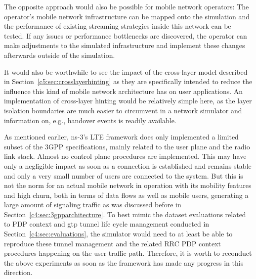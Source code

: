 The opposite approach would also be possible for mobile network operators: The operator's mobile network infrastructure can be mapped onto the simulation and the performance of existing streaming strategies inside this network can be tested. If any issues or performance bottlenecks are discovered, the operator can make adjustments to the simulated infrastructure and implement these changes afterwards outside of the simulation.

It would also be worthwhile to see the impact of the cross-layer model described in Section~\ref{c5:sec:crosslayerhinting} as they are specifically intended to reduce the influence this kind of mobile network architecture has on user applications. An implementation of cross-layer hinting would be relatively simple here, as the layer isolation boundaries are much easier to circumvent in a network simulator and information on, e.g., handover events is readily available.

As mentioned earlier, ns-3's \gls{LTE} framework does only implemented a limited subset of the \gls{3GPP} specifications, mainly related to the user plane and the radio link stack. Almost no control plane procedures are implemented. This may have only a negligible impact as soon as a connection is established and remains stable and only a very small number of users are connected to the system. But this is not the norm for an actual mobile network in operation with its mobility features and high churn, both in terms of data flows as well as mobile users, generating a large amount of signaling traffic as was discussed before in Section~\ref{c4:sec:3gpparchitecture}. To best mimic the dataset evaluations related to \gls{PDP} context and \gls{gtp} tunnel life cycle management conducted in Section~\ref{c4:sec:evaluations}, the simulator would need to at least be able to reproduce these tunnel management and the related \gls{RRC} \gls{PDP} context procedures happening on the user traffic path. Therefore, it is worth to reconduct the above experiments as soon as the framework has made any progress in this direction.







